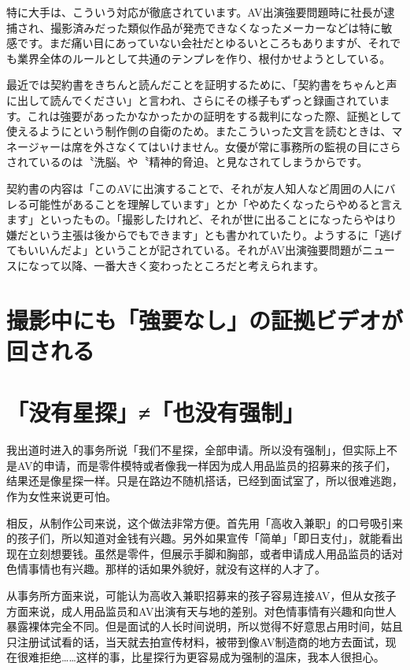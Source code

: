 \documentclass[12pt,UTF8]{ctexbook}
\begin{document}
特に大手は、こういう対応が徹底されています。AV出演強要問題時に社長が逮捕され、撮影済みだった類似作品が発売できなくなったメーカーなどは特に敏感です。まだ痛い目にあっていない会社だとゆるいところもありますが、それでも業界全体のルールとして共通のテンプレを作り、根付かせようとしている。

最近では契約書をきちんと読んだことを証明するために、「契約書をちゃんと声に出して読んでください」と言われ、さらにその様子もずっと録画されています。これは強要があったかなかったかの証明をする裁判になった際、証拠として使えるようにという制作側の自衛のため。またこういった文言を読むときは、マネージャーは席を外さなくてはいけません。女優が常に事務所の監視の目にさらされているのは〝洗脳〟や〝精神的脅迫〟と見なされてしまうからです。

契約書の内容は「このAVに出演することで、それが友人知人など周囲の人にバレる可能性があることを理解しています」とか「やめたくなったらやめると言えます」といったもの。「撮影したけれど、それが世に出ることになったらやはり嫌だという主張は後からでもできます」とも書かれていたり。ようするに「逃げてもいいんだよ」ということが記されている。それがAV出演強要問題がニュースになって以降、一番大きく変わったところだと考えられます。

\section{撮影中にも「強要なし」の証拠ビデオが回される}

\switchcolumn

\section{「没有星探」≠「也没有强制」}

我出道时进入的事务所说「我们不星探，全部申请。所以没有强制」，但实际上不是AV的申请，而是零件模特或者像我一样因为成人用品监员的招募来的孩子们，结果还是像星探一样。只是在路边不随机搭话，已经到面试室了，所以很难逃跑，作为女性来说更可怕。

相反，从制作公司来说，这个做法非常方便。首先用「高收入兼职」的口号吸引来的孩子们，所以知道对金钱有兴趣。另外如果宣传「简单」「即日支付」，就能看出现在立刻想要钱。虽然是零件，但展示手脚和胸部，或者申请成人用品监员的话对色情事情也有兴趣。那样的话如果外貌好，就没有这样的人才了。

从事务所方面来说，可能认为高收入兼职招募来的孩子容易连接AV，但从女孩子方面来说，成人用品监员和AV出演有天与地的差别。对色情事情有兴趣和向世人暴露裸体完全不同。但是面试的人长时间说明，所以觉得不好意思占用时间，姑且只注册试试看的话，当天就去拍宣传材料，被带到像AV制造商的地方去面试，现在很难拒绝……这样的事，比星探行为更容易成为强制的温床，我本人很担心。
\end{document}
